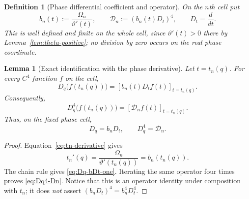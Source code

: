\documentclass[11pt]{amsart}
\numberwithin{equation}{section}
\newtheorem{lemma}[theorem]{Lemma}
\newtheorem{definition}[theorem]{Definition}
\begin{document}
\begin{definition}[Phase differential coefficient and operator]
\label{def:phase-differential-operator}
On the $n$th cell put
\begin{equation}
 \boxed{
 b_n(t):=\frac{\Omega_n}{\vartheta'(t)},
 \qquad
 \mathcal D_n:=(b_n(t)D_t)^4,
 \qquad D_t=\frac{d}{dt}.
 }
 \label{eq:bn-Dn-definition}
\end{equation}
This is well defined and finite on the whole cell, since $\vartheta'(t)>0$
there by Lemma~\ref{lem:theta-positive}; no division by zero occurs on the
real phase coordinate.
\end{definition}

\begin{lemma}[Exact identification with the phase derivative]
\label{lem:Dq-equals-bDt}
Let $t=t_n(q)$.  For every $C^4$ function $f$ on the cell,
\begin{equation}
 \boxed{
 D_q\bigl(f(t_n(q))\bigr)
 =\left[b_n(t)D_t f(t)\right]_{t=t_n(q)}.
 }
 \label{eq:Dq-bDt-one}
\end{equation}
Consequently,
\begin{equation}
 \boxed{
 D_q^4\bigl(f(t_n(q))\bigr)
 =\left[\mathcal D_n f(t)\right]_{t=t_n(q)}.
 }
 \label{eq:Dq4-Dn}
\end{equation}
Thus, on the fixed phase cell,
\begin{equation}
 \boxed{D_q=b_nD_t,\qquad D_q^4=\mathcal D_n.}
 \label{eq:Dq-operator-identification}
\end{equation}
\end{lemma}

\begin{proof}
Equation~\eqref{eq:tn-derivative} gives
\begin{equation}
 t_n'(q)=\frac{\Omega_n}{\vartheta'(t_n(q))}=b_n(t_n(q)).
 \label{eq:tnprime-is-bn}
\end{equation}
The chain rule gives \eqref{eq:Dq-bDt-one}.  Iterating the same operator four
times proves \eqref{eq:Dq4-Dn}.  Notice that this is an operator identity
under composition with $t_n$; it does \emph{not} assert
$(b_nD_t)^4=b_n^4D_t^4$.
\end{proof}
\end{document}
